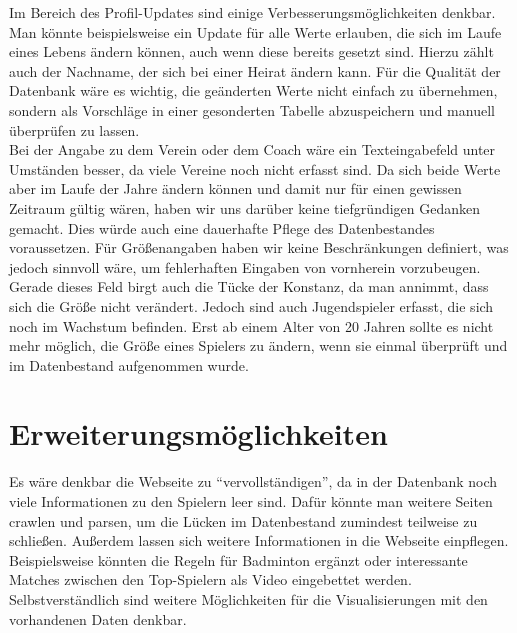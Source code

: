 Im Bereich des Profil-Updates sind einige Verbesserungsmöglichkeiten denkbar. Man könnte beispielsweise ein Update für alle Werte erlauben, die sich im Laufe eines Lebens ändern können, auch wenn diese bereits gesetzt sind. Hierzu zählt auch der Nachname, der sich bei einer Heirat ändern kann. Für die Qualität der Datenbank wäre es wichtig, die geänderten Werte nicht einfach zu übernehmen, sondern als Vorschläge in einer gesonderten Tabelle abzuspeichern und manuell überprüfen zu lassen.\\

Bei der Angabe zu dem Verein oder dem Coach wäre ein Texteingabefeld unter Umständen besser, da viele Vereine noch nicht erfasst sind. Da sich beide Werte aber im Laufe der Jahre ändern können und damit nur für einen gewissen Zeitraum gültig wären, haben wir uns darüber keine tiefgründigen Gedanken gemacht. Dies würde auch eine dauerhafte Pflege des Datenbestandes voraussetzen. 
\newline \newline
Für Größenangaben haben wir keine Beschränkungen definiert, was jedoch sinnvoll wäre, um fehlerhaften Eingaben von vornherein vorzubeugen. Gerade dieses Feld birgt auch die Tücke der Konstanz, da man annimmt, dass sich die Größe nicht verändert. Jedoch sind auch Jugendspieler erfasst, die sich noch im Wachstum befinden. Erst ab einem Alter von 20 Jahren sollte es nicht mehr möglich, die Größe eines Spielers zu ändern, wenn sie einmal überprüft und im Datenbestand aufgenommen wurde.

\section{Erweiterungsmöglichkeiten}
Es wäre denkbar die Webseite zu "`vervollständigen"', da in der Datenbank noch viele Informationen zu den Spielern leer sind. Dafür könnte man weitere Seiten crawlen und parsen, um die Lücken im Datenbestand zumindest teilweise zu schließen. Außerdem lassen sich weitere Informationen in die Webseite einpflegen. Beispielsweise könnten die Regeln für Badminton ergänzt oder interessante Matches zwischen den Top-Spielern als Video eingebettet werden. Selbstverständlich sind weitere Möglichkeiten für die Visualisierungen mit den vorhandenen Daten denkbar.